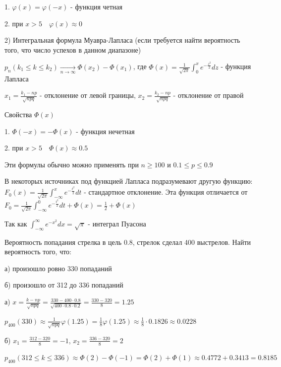 \documentclass[12pt]{article}
\begin{document}
    1. $\varphi(x) = \varphi(-x)$ - функция четная

    2. при $x > 5 \quad \varphi(x) \approx 0$

    \hypertarget{integralformulademoivrelaplace}{}

    2) Интегральная формула Муавра-Лапласа (если требуется найти вероятность того, что число успехов в данном диапазоне)

    $p_n(k_1 \leq k \leq k_2) \underset{n \to \infty}{\longrightarrow} \Phi(x_2) - \Phi(x_1)$, где $\Phi(x) = \frac{1}{\sqrt{2\pi}} \int_0^x e^{-\frac{z^2}{2}} dz$ - функция Лапласа

    $x_1 = \frac{k_1 - np}{\sqrt{npq}}$ - отклонение от левой границы, $x_2 = \frac{k_2 - np}{\sqrt{npq}}$ - отклонение от правой

    Свойства $\Phi(x)$

    1. $\Phi(-x) = -\Phi(x)$ - функция нечетная

    2. при $x > 5 \quad \Phi(x) \approx 0.5$

    \Nota Эти формулы обычно можно применять при $n \geq 100$ и $0.1 \leq p \leq 0.9$

    \Nota В некоторых источниках под функцией Лапласа подразумевают другую функцию: $F_0(x) = \frac{1}{\sqrt{2\pi}} \int_{-\infty}^x e^{-\frac{t^2}{2}}dt$ - стандартное отклонение. Эта функция
    отличается от $F_0 = \frac{1}{\sqrt{2\pi}} \int_{-\infty}^0 e^{-\frac{t^2}{2}}dt + \Phi(x) = \frac{1}{2} + \Phi(x)$

    Так как $\int_{-\infty}^{\infty} e^{-x^2} dx = \sqrt{\pi}$ - интеграл Пуасона

    \Ex Вероятность попадания стрелка в цель $0.8$, стрелок сделал 400 выстрелов. Найти вероятность того, что:

    а) произошло ровно 330 попаданий

    б) произошло от 312 до 336 попаданий

    а) $x = \frac{k - np}{\sqrt{npq}} = \frac{330 - 400 \cdot 0.8}{\sqrt{400 \cdot 0.8 \cdot 0.2}} = \frac{330 - 320}{8} = 1.25$

    $p_{400}(330) \approx \frac{1}{\sqrt{npq}} \varphi(1.25) = \frac{1}{8} \varphi(1.25) \approx \frac{1}{8} \cdot 0.1826 \approx 0.0228$

    б) $x_1 = \frac{312 - 320}{8} = -1$, $x_2 = \frac{336 - 320}{8} = 2$

    $p_{400}(312 \leq k \leq 336) \approx \Phi(2) - \Phi(-1) = \Phi(2) + \Phi(1) \approx 0.4772 + 0.3413 = 0.8185$
\end{document}
